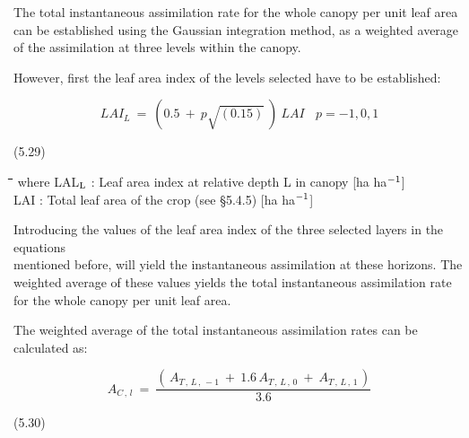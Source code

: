 The total instantaneous assimilation rate for the whole canopy per unit leaf area can be
established using the Gaussian integration method, as a weighted average of the assimila\-tion at three levels within the canopy.



However, first the leaf area index of the levels selected have to be established:

\begin{displaymath}
LAI _{L} ~=~ (0.5~+~p \sqrt{(0.15)} ~)~LAI~~~~p=-1,0,1
\end{displaymath}

 
\strut\hfill (5.29)
\nwln
\begin{tabbing}
\hspace{1.27cm}\=\hspace{1.27cm}\=\hspace{1.27cm}\=\hspace{1.27cm}\=%
\hspace{1.27cm}\=\hspace{1.27cm}\=\hspace{1.27cm}\=\hspace{1.27cm}\=%
\hspace{1.27cm}\=\hspace{1.27cm}\=\kill
where LAL$_{{\rm L}}$ : Leaf area index at relative depth L in canopy        [ha ha$^{{\rm -1}}$]\\
LAI : Total leaf area of the crop    (see \S 5.4.5)    [ha ha$^{{\rm -1}}$]
\end{tabbing}



Introducing the values of the leaf area index of the three selected layers in the equations\\
mentioned before, will yield the instantaneous assimilation at these horizons. The
weighted average of these values yields the total instantaneous assimilation rate for the
whole canopy per unit leaf area.






 The weighted average of the total instanta\-neous assimilation rates can be calculated as:

\begin{displaymath}
A _{C\, ,\, l} ~=~{\frac{(\, A _{T\, ,\, L\, ,\, -1} ~+~1.6\, A _{T\, ,\, L\, ,\, 0} ~+~A _{T\, ,\, L\, ,\, 1\, } )}{3.6}}
\end{displaymath}

 
\strut\hfill (5.30)

